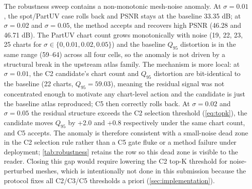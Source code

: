 The robustness sweep contains a non-monotonic mesh-noise anomaly. At \(\sigma=0.01\), the spot/PartUV case rolls back and PSNR stays at the baseline 33.35 dB; at \(\sigma=0.02\) and \(\sigma=0.05\), the method accepts and recovers high PSNR (46.28 and 46.71 dB). The PartUV chart count grows monotonically with noise (19, 22, 23, 25 charts for \(\sigma\in\{0,0.01,0.02,0.05\}\)) and the baseline \(Q_{95}\) distortion is in the same range (59--64) across all four cells, so the anomaly is not driven by a structural break in the upstream atlas family. The mechanism is more local: at \(\sigma=0.01\), the C2 candidate's chart count and \(Q_{95}\) distortion are bit-identical to the baseline (22 charts, \(Q_{95}=59.03\)), meaning the residual signal was not concentrated enough to motivate any chart-level action and the candidate is just the baseline atlas reproduced; C5 then correctly rolls back. At \(\sigma=0.02\) and \(\sigma=0.05\) the residual structure exceeds the C2 selection threshold (\cref{eq:topk}), the candidate moves \(Q_{95}\) by +2.0 and +0.8 respectively under the same chart count, and C5 accepts. The anomaly is therefore consistent with a small-noise dead zone in the C2 selection rule rather than a C5 gate fluke or a method failure under deployment; \cref{tab:robustness} retains the row so this dead zone is visible to the reader. Closing this gap would require lowering the C2 top-K threshold for noise-perturbed meshes, which is intentionally not done in this submission because the protocol fixes all C2/C3/C5 thresholds a priori (\cref{sec:implementation}).
